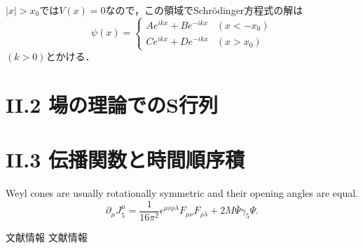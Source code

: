 \documentclass[uplatex]{jsarticle}
\numberwithin{theorem}{section}
\begin{document}
$|x| > x_0$では$V(x)=0$なので，この領域でSchr\"{o}dinger方程式の解は
\begin{equation}
    \psi (x)
    =\begin{cases}
        A e^{ikx} + B e^{-ikx} & (x<-x_0) \\
        C e^{ikx} + D e^{-ikx} & (x>x_0)
    \end{cases}
\end{equation}
$(k>0)$とかける．


\section*{II.2 場の理論でのS行列}


\section*{II.3 伝播関数と時間順序積}
Weyl cones are usually rotationally symmetric and their opening angles are equal.
\begin{equation}
    \partial_\mu J_5^\mu
    = \frac{1}{16\pi^2} \epsilon^{\mu\nu\rho\lambda} F_{\mu\nu} F_{\rho\lambda}
    + 2M \bar{\Psi}\gamma_5 \Psi.
\end{equation} %


\begin{thebibliography}{99}
 文献情報
 文献情報
\end{thebibliography}
\end{document}
